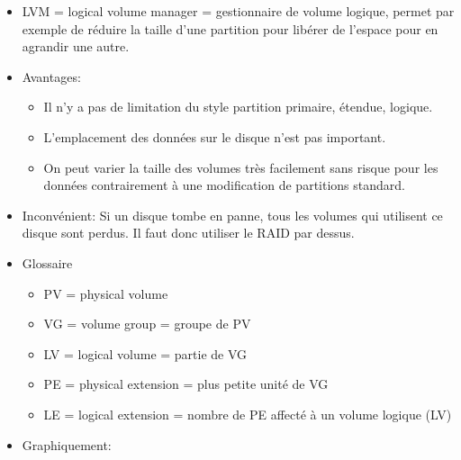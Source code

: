 \documentclass[a4paper]{article}
\begin{document}
\begin{itemize}

\item LVM = logical volume manager = gestionnaire de volume logique, permet par exemple de réduire la taille d’une partition pour libérer de l’espace pour en agrandir une autre.

\item Avantages:
\begin{itemize}
    \item Il n’y a pas de limitation du style partition primaire, étendue, logique.
    \item L’emplacement des données sur le disque n’est pas important.
    \item On peut varier la taille des volumes très facilement sans risque pour les données contrairement à une modification de partitions standard.
\end{itemize}

\item Inconvénient: Si un disque tombe en panne, tous les volumes qui utilisent ce disque sont perdus. Il faut donc utiliser le RAID par dessus.

\item Glossaire
\begin{itemize}
    \item PV = physical volume
    \item VG = volume group = groupe de PV
    \item LV = logical volume = partie de VG
    \item PE = physical extension = plus petite unité de VG
    \item LE = logical extension = nombre de PE affecté à un volume logique (LV)
\end{itemize}

\item Graphiquement:
\begin{center}
\end{center}
\end{itemize}
\end{document}

